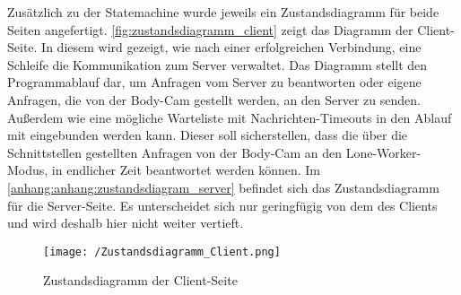\documentclass[thesis.tex]{subfiles}
\begin{document}
Zusätzlich zu der Statemachine wurde jeweils ein Zustandsdiagramm für beide Seiten angefertigt.
\autoref{fig:zustandsdiagramm_client} zeigt das Diagramm der Client-Seite.
In diesem wird gezeigt, wie nach einer erfolgreichen Verbindung, eine Schleife die Kommunikation zum Server verwaltet.
Das Diagramm stellt den Programmablauf dar, um Anfragen vom Server zu beantworten oder eigene Anfragen, die von der Body-Cam gestellt werden, an den Server zu senden.
Außerdem wie eine mögliche Warteliste mit Nachrichten-Timeouts in den Ablauf mit eingebunden werden kann.
Dieser soll sicherstellen, dass die über die Schnittstellen gestellten Anfragen von der Body-Cam an den Lone-Worker-Modus, in endlicher Zeit beantwortet werden können.
Im \autoref{anhang:anhang:zustandsdiagram_server} befindet sich das Zustandsdiagramm für die Server-Seite.
Es unterscheidet sich nur geringfügig von dem des Clients und wird deshalb hier nicht weiter vertieft.

\begin{figure}[h]
    \centering
    \texttt{[image: /Zustandsdiagramm\_Client.png]}
    \caption{Zustandsdiagramm der Client-Seite}
    \label{fig:zustandsdiagramm_client}
\end{figure}

\subfilebib %
\end{document}
